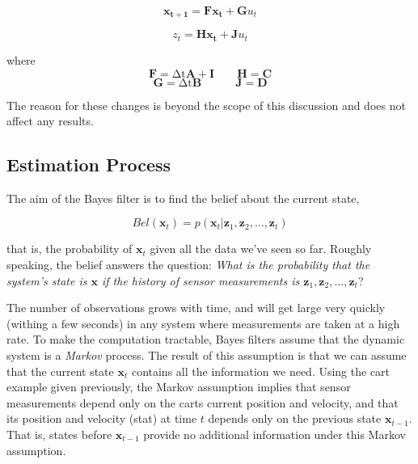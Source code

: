 \begin{equation}
\mathbf{x_{t+1}} = \mathbf{F}\mathbf{x_{t}} + \mathbf{G}u_{t}
\end{equation}

\begin{equation}
z_{t} = \mathbf{H}\mathbf{x_{t}} + \mathbf{J}u_{t}
\end{equation}

where
\begin{equation*}
    \mathbf{F} = \mathrm{\Delta t}\mathbf{A} + \mathbf{I}
    \quad\quad\mathbf{H} = \mathbf{C}
\end{equation*}
\begin{equation*}
\mathbf{G} = \mathrm{\Delta t}\mathbf{B}
\quad\quad\quad\mathbf{J} = \mathbf{D}
\end{equation*}

The reason for these changes is beyond the scope of this discussion and does
not affect any results.

\subsection{Estimation Process}
The aim of the Bayes filter is to find the belief about the current state,

\begin{equation}
Bel(\mathbf{x}_{t}) = p(\mathbf{x}_{t} | \mathbf{z}_{1}, \mathbf{z}_{2}, \dots
, \mathbf{z}_{t})
\end{equation}

that is, the probability of $\mathbf{x}_{t}$ given all the data we've seen so far.
Roughly speaking, the belief answers the question: \emph{What is the probability
that the system's state is $\mathbf{x}$ if the history of sensor measurements is
$\mathbf{z}_{1}, \mathbf{z}_{2}, \dots, \mathbf{z}_{t}$}?

The number of observations grows with time, and will get large very quickly
(withing a few seconds) in any system where measurements are taken at a high rate.
To make the computation tractable,
Bayes filters assume that the dynamic system is a \emph{Markov} process.\cite{ref:4}
The result of this assumption is that we can
assume that the
current state $\mathbf{x}_{t}$ contains all the information we need. Using
the cart example given previously, the Markov assumption implies that sensor measurements
depend only on the carts current position and velocity, and that its position
and velocity (stat) at
time $t$ depends only on the previous state $\mathbf{x}_{t-1}$. That is, states
before $\mathbf{x}_{t-1}$ provide no additional information under this Markov
assumption.

